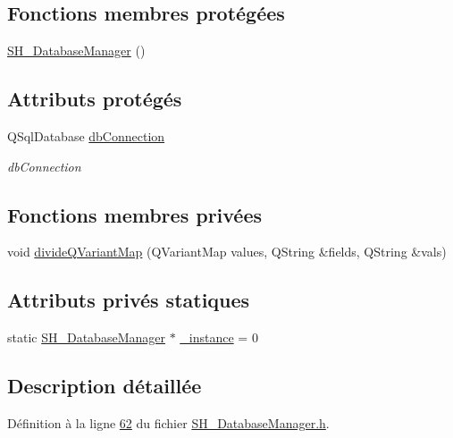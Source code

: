 \subsection*{Fonctions membres protégées}
\begin{DoxyCompactItemize}
\item 
\hyperlink{classSH__DatabaseManager_a7b5d0e372c153eb59cdab98588994904}{S\-H\-\_\-\-Database\-Manager} ()
\end{DoxyCompactItemize}
\subsection*{Attributs protégés}
\begin{DoxyCompactItemize}
\item 
Q\-Sql\-Database \hyperlink{classSH__DatabaseManager_a9291f61c3abbba2c4f1567b1d8325f0e}{db\-Connection}
\begin{DoxyCompactList}\small\item\em db\-Connection \end{DoxyCompactList}\end{DoxyCompactItemize}
\subsection*{Fonctions membres privées}
\begin{DoxyCompactItemize}
\item 
void \hyperlink{classSH__DatabaseManager_acab8936d9c694610eda1c157a405ead3}{divide\-Q\-Variant\-Map} (Q\-Variant\-Map values, Q\-String \&fields, Q\-String \&vals)
\end{DoxyCompactItemize}
\subsection*{Attributs privés statiques}
\begin{DoxyCompactItemize}
\item 
static \hyperlink{classSH__DatabaseManager}{S\-H\-\_\-\-Database\-Manager} $\ast$ \hyperlink{classSH__DatabaseManager_a8ca37d0cafa6a181582d60e045a8d5ab}{\-\_\-instance} = 0
\end{DoxyCompactItemize}


\subsection{Description détaillée}


Définition à la ligne \hyperlink{SH__DatabaseManager_8h_source_l00062}{62} du fichier \hyperlink{SH__DatabaseManager_8h_source}{S\-H\-\_\-\-Database\-Manager.\-h}.



